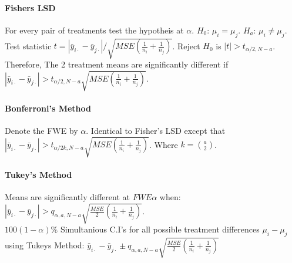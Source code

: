 \documentclass[10pt]{article}
\begin{document}
\paragraph{Fishers LSD} For every pair of treatments test the hypotheis at $\alpha$.  $H_0$: $\mu_i = \mu_j$. $H_a$: $\mu_i \neq \mu_j$. \\
Test statistic $t = \left| \bar{y}_{i \cdot} - \bar{y}_{j \cdot} \right| / \sqrt{MSE \left( \frac{1}{n_i} + \frac{1}{n_j} \right)}$. Reject $H_0$ is $\left| t \right| > t_{\alpha/2, N-a}$.\\
Therefore, The 2 treatment means are significantly different if $\left| \bar{y}_{i \cdot} - \bar{y}_{j \cdot} \right| > t_{\alpha/2, N-a} \sqrt{MSE \left( \frac{1}{n_i} + \frac{1}{n_j} \right)}$.


\paragraph{Bonferroni's Method} Denote the FWE by $\alpha$. Identical to Fisher's LSD except that $\left| \bar{y}_{i \cdot} - \bar{y}_{j \cdot} \right| > t_{\alpha/2k, N-a} \sqrt{MSE \left( \frac{1}{n_i} + \frac{1}{n_j} \right)}$.
Where $k = \binom{a}{2}$.

\paragraph{Tukey's Method} Means are significantly different at $FWE \alpha$ when:
$\left| \bar{y}_{i \cdot} - \bar{y}_{j \cdot} \right| > q_{\alpha,a, N-a} \sqrt{\frac{MSE}{2} \left( \frac{1}{n_i} + \frac{1}{n_j} \right)}$. \\
$100(1-\alpha)\%$ Simultanious C.I's for all possible treatment differences $\mu_i - \mu_j$ using Tukeys Method:
$\bar{y}_{i \cdot} - \bar{y}_{j \cdot} \pm q_{\alpha,a,N-a} \sqrt{\frac{MSE}{2} \left( \frac{1}{n_i} + \frac{1}{n_j} \right)}$ 
\end{document}
